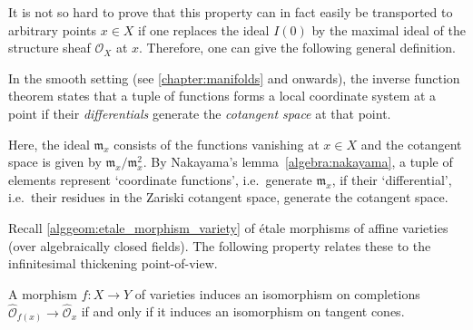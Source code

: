     It is not so hard to prove that this property can in fact easily be transported to arbitrary points $x\in X$ if one replaces the ideal $I(0)$ by the maximal ideal of the structure sheaf $\mathcal{O}_X$ at $x$. Therefore, one can give the following general definition.
    \begin{property}
        In the smooth setting (see \cref{chapter:manifolds} and onwards), the inverse function theorem states that a tuple of functions forms a local coordinate system at a point if their \textit{differentials} generate the \textit{cotangent space} at that point.

        Here, the ideal $\mathfrak{m}_x$ consists of the functions vanishing at $x\in X$ and the cotangent space is given by $\mathfrak{m}_x/\mathfrak{m}_x^2$. By Nakayama's lemma~\ref{algebra:nakayama}, a tuple of elements represent `coordinate functions', i.e.~generate $\mathfrak{m}_x$, if their `differential', i.e.~their residues in the Zariski cotangent space, generate the cotangent space.
    \end{property}



    Recall \cref{alggeom:etale_morphism_variety} of \'etale morphisms of affine varieties (over algebraically closed fields). The following property relates these to the infinitesimal thickening point-of-view.
    \begin{property}\label{alggeom:tangent_cone_etale}
        A morphism $f:X\rightarrow Y$ of varieties induces an isomorphism on completions $\widehat{\mathcal{O}}_{f(x)}\rightarrow\widehat{\mathcal{O}}_x$ if and only if it induces an isomorphism on tangent cones.
    \end{property}

